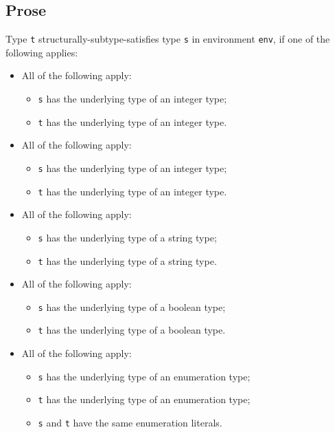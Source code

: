 \documentclass{book}
\newcommand\tenv[0]{\texttt{env}}
\begin{document}
\subsection{Prose}
Type \texttt{t} structurally-subtype-satisfies type \texttt{s} in environment \tenv, if one of the following applies:
  \begin{itemize}
  \item All of the following apply:
    \begin{itemize}
    \item \texttt{s} has the underlying type of an integer type;
    \item \texttt{t} has the underlying type of an integer type.
    \end{itemize}

  \item All of the following apply:
    \begin{itemize}
    \item \texttt{s} has the underlying type of an integer type;
    \item \texttt{t} has the underlying type of an integer type.
    \end{itemize}

  \item All of the following apply:
    \begin{itemize}
    \item \texttt{s} has the underlying type of a string type;
    \item \texttt{t} has the underlying type of a string type.
    \end{itemize}

  \item All of the following apply:
    \begin{itemize}
    \item \texttt{s} has the underlying type of a boolean type;
    \item \texttt{t} has the underlying type of a boolean type.
    \end{itemize}

  \item All of the following apply:
    \begin{itemize}
    \item \texttt{s} has the underlying type of an enumeration type;
    \item \texttt{t} has the underlying type of an enumeration type;
    \item \texttt{s} and \texttt{t} have the same enumeration literals.
   \end{itemize}


\end{itemize}
\end{document}
